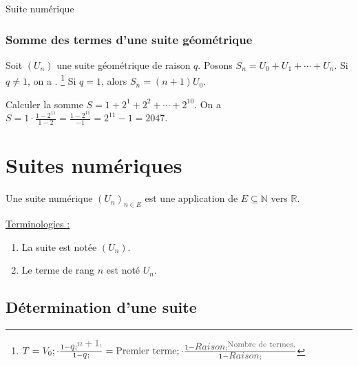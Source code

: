 \begin{chapter}{Suite num\'erique}
\subsubsection{Somme des termes d'une suite g\'eom\'etrique}
%
Soit $(U_n)$ une suite g\'eom\'etrique de raison $q$.
Posons $S_n = U_0 + U_1 + \cdots + U_n$.
Si $q \neq 1$, on a
.%
	\footnote{%
					$
						T = \tikznode{V0}{\textcolor{loko2}{$V_0$}};
						\cdot
						\frac{1-\tikznode{q1}{\textcolor{loko1}{$q$}};^{\tikznode{n+1}{\textcolor{loko3}{$n+1$}};}}
						{1-\tikznode{q2}{\textcolor{loko1}{$q$}};}
						= \tikznode{Premier_terme}{\text{\textcolor{loko2}{$\text{Premier terme}$}}}; \cdot 
						\frac{1-\tikznode{Raison1}{\text{\textcolor{loko1}{$Raison$}}};^{ \tikznode{Nombre_de_termes}
						{\text{\textcolor{loko3}{\footnotesize{Nombre de termes}}}}; }}
						{ 1-\tikznode{Raison2}{\text{\textcolor{loko1}{$Raison$}}}; }
					$
		}
Si $q = 1$, alors $S_n = (n+1)U_0$.
%
\begin{ex}
Calculer la somme $S = 1 + 2^1 + 2^2 + \cdots + 2^{10}$.
On a 
$
S = 1 \cdot \frac{1 - 2^{11}}{1- 2} = \frac{1 - 2^{11}}{-1} = 2^{11} - 1 = 2047.
$
\end{ex}
%
\section{Suites num\'eriques}
%
\begin{defi}
Une suite num\'erique $(U_n)_{n \in E}$ est une application de $E \subseteq \mathbb{N}$ vers $\mathbb{R}$.
\end{defi}
%
\noindent
\underline{Terminologies :} \\
\begin{enumerate}
\item La suite est not\'ee $(U_n)$.
\item Le terme de rang $n$ est not\'e $U_n$.
\end{enumerate}
%
\subsection{D\'etermination d'une suite}
%

\end{chapter}

